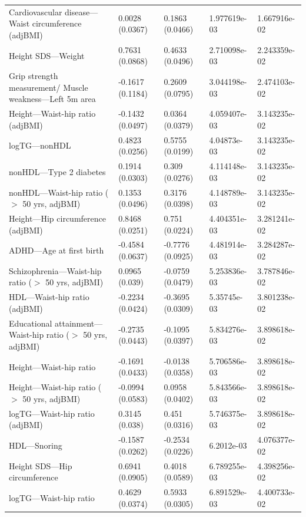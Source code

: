 \documentclass{article}\usepackage[]{graphicx}\usepackage[dvipsnames]{xcolor}
\begin{document}
\begin{longtable}{p{6cm}|p{1.5cm}|p{1.5cm}|p{1.5cm}}
  Cardiovascular disease---Waist circumference (adjBMI) & 0.0028 (0.0367) & 0.1863 (0.0466) & 1.977619e-03 & 1.667916e-02 \\ 
  Height SDS---Weight & 0.7631 (0.0868) & 0.4633 (0.0496) & 2.710098e-03 & 2.243359e-02 \\ 
  Grip strength measurement/ Muscle weakness---Left 5m area & -0.1617 (0.1184) & 0.2609 (0.0795) & 3.044198e-03 & 2.474103e-02 \\ 
  Height---Waist-hip ratio (adjBMI) & -0.1432 (0.0497) & 0.0364 (0.0379) & 4.059407e-03 & 3.143235e-02 \\ 
  logTG---nonHDL & 0.4823 (0.0256) & 0.5755 (0.0199) & 4.04873e-03 & 3.143235e-02 \\ 
  nonHDL---Type 2 diabetes & 0.1914 (0.0303) & 0.309 (0.0276) & 4.114148e-03 & 3.143235e-02 \\ 
  nonHDL---Waist-hip ratio ($>$ 50 yrs, adjBMI) & 0.1353 (0.0496) & 0.3176 (0.0398) & 4.148789e-03 & 3.143235e-02 \\ 
  Height---Hip circumference (adjBMI) & 0.8468 (0.0251) & 0.751 (0.0224) & 4.404351e-03 & 3.281241e-02 \\ 
  ADHD---Age at first birth & -0.4584 (0.0637) & -0.7776 (0.0925) & 4.481914e-03 & 3.284287e-02 \\ 
  Schizophrenia---Waist-hip ratio ($>$ 50 yrs, adjBMI) & 0.0965 (0.039) & -0.0759 (0.0479) & 5.253836e-03 & 3.787846e-02 \\ 
  HDL---Waist-hip ratio (adjBMI) & -0.2234 (0.0424) & -0.3695 (0.0309) & 5.35745e-03 & 3.801238e-02 \\ 
  Educational attainment---Waist-hip ratio ($>$ 50 yrs, adjBMI) & -0.2735 (0.0443) & -0.1095 (0.0397) & 5.834276e-03 & 3.898618e-02 \\ 
  Height---Waist-hip ratio & -0.1691 (0.0433) & -0.0138 (0.0358) & 5.706586e-03 & 3.898618e-02 \\ 
  Height---Waist-hip ratio ($>$ 50 yrs, adjBMI) & -0.0994 (0.0583) & 0.0958 (0.0402) & 5.843566e-03 & 3.898618e-02 \\ 
  logTG---Waist-hip ratio (adjBMI) & 0.3145 (0.038) & 0.451 (0.0316) & 5.746375e-03 & 3.898618e-02 \\ 
  HDL---Snoring & -0.1587 (0.0262) & -0.2534 (0.0226) & 6.2012e-03 & 4.076377e-02 \\ 
  Height SDS---Hip circumference & 0.6941 (0.0905) & 0.4018 (0.0589) & 6.789255e-03 & 4.398256e-02 \\ 
  logTG---Waist-hip ratio & 0.4629 (0.0374) & 0.5933 (0.0305) & 6.891529e-03 & 4.400733e-02 \\ 

\end{longtable}
\end{document}
